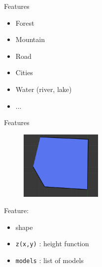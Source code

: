 \documentclass{beamer}
\begin{document}
\begin{frame}{Features}
  \begin{itemize}
    \item Forest
    \item Mountain
    \item Road
    \item Cities
    \item Water (river, lake)
    \item ...
  \end{itemize}
\end{frame}

\begin{frame}{Features}
  \begin{figure}
    \begin{center}
      \includegraphics[width=4cm]{feature}
    \end{center}
  \end{figure}
  Feature:
  \begin{itemize}
    \item {\color{Cerulean}shape}
    \item \texttt{z(x,y)} : height function
    \item \texttt{models} : list of models
  \end{itemize}
\end{frame}
\end{document}
